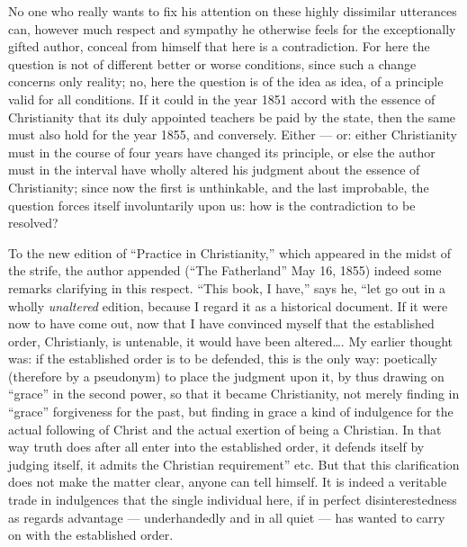 \documentclass[12pt,a4paper,openany]{book}
\newcommand{\opage}[1]{\marginnote{\footnotesize\textit{[#1]}}}
\begin{document}
No one who really wants to fix his attention on
these highly dissimilar utterances can, however much respect
and sympathy he otherwise feels for the exceptionally
gifted author, conceal from himself that here
is a contradiction. For here the question is not of different
better or worse conditions, since such a change concerns
only reality; no, here the question is of the idea as
idea, of a principle valid for all conditions. If it
could in the year 1851 accord with the essence of Christianity
that its duly appointed teachers be paid by the state,
then the same must also hold for the year
1855, and conversely. Either --- or: either Christianity must
in the course of four years have changed its principle, or
else the author must in the interval have wholly
altered his judgment about the essence of Christianity; since now
the first is unthinkable, and the last improbable,
the question forces itself involuntarily upon us: how
is the contradiction to be resolved?

\setcounter{footnote}{0}%
\opage{22}To the new edition of ``Practice in Christianity,'' which
appeared in the midst of the strife, the author appended (``The Fatherland''
May 16, 1855) indeed some remarks clarifying
in this respect. ``This book, I have,''
says he, ``let go out in a wholly \emph{unaltered} edition,
because I regard it as a historical document.
If it were now to have come out, now that I have convinced
myself that the established order, Christianly, is untenable,
it would have been altered\dots{}. My earlier
thought was: if the established order is to be defended,
this is the only way: poetically (therefore by a
pseudonym) to place the judgment upon it, by thus
drawing on ``grace'' in the second power, so that it became Christianity,
not merely finding in ``grace'' forgiveness for
the past, but finding in grace a kind of indulgence
for the actual following of Christ and the actual
exertion of being a Christian. In that way
truth does after all enter into the established order, it defends
itself by judging itself, it admits the Christian
requirement'' etc. But that this clarification does not
make the matter clear, anyone can tell himself. It %
is indeed a veritable trade in indulgences that the single individual here, if
in perfect disinterestedness as regards advantage
--- underhandedly and in all quiet --- has wanted to carry on
with the established order.
\end{document}
